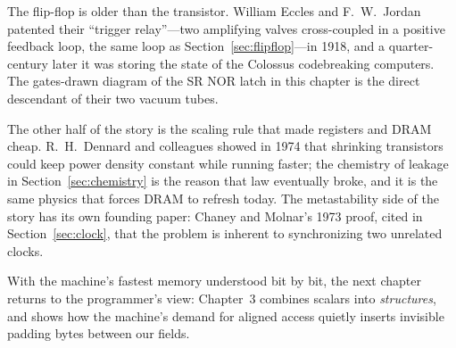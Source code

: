 \begin{researchnote}
The flip-flop is older than the transistor. William Eccles and
F.~W.~Jordan patented their ``trigger relay''---two amplifying valves
cross-coupled in a positive feedback loop, the same loop as
Section~\ref{sec:flipflop}---in 1918, and a quarter-century later it
was storing the state of the Colossus codebreaking computers. The
gates-drawn diagram of the SR NOR latch in this chapter is the direct
descendant of their two vacuum tubes.

The other half of the story is the scaling rule that made registers
and DRAM cheap. R.~H.~Dennard and colleagues showed in 1974 that
shrinking transistors could keep power density constant while running
faster; the chemistry of leakage in Section~\ref{sec:chemistry} is
the reason that law eventually broke, and it is the same physics that
forces DRAM to refresh today. The metastability side of the story
has its own founding paper: Chaney and Molnar's 1973 proof, cited in
Section~\ref{sec:clock}, that the problem is inherent to synchronizing
two unrelated clocks.

\end{researchnote}

With the machine's fastest memory understood bit by bit, the next
chapter returns to the programmer's view: Chapter~3 combines scalars
into \emph{structures}, and shows how the machine's demand for
aligned access quietly inserts invisible padding bytes between our
fields.
